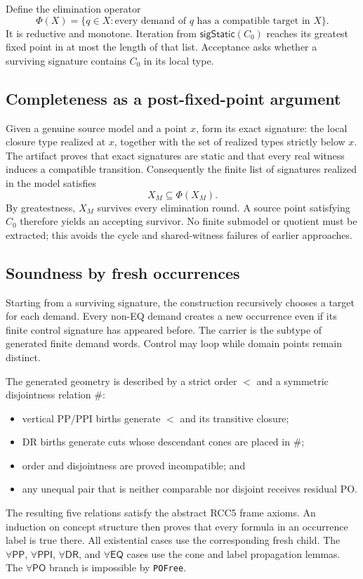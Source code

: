 \documentclass[11pt]{article}
\newcommand{\PP}{\mathsf{PP}}
\newcommand{\PPI}{\mathsf{PPI}}
\newcommand{\PO}{\mathsf{PO}}
\newcommand{\DR}{\mathsf{DR}}
\newcommand{\EQ}{\mathsf{EQ}}
\newcommand{\code}[1]{\texttt{#1}}
\begin{document}
Define the elimination operator
\[
  \Phi(X)=\{q\in X:\text{every demand of }q\text{ has a compatible target in }X\}.
\]
It is reductive and monotone. Iteration from $\mathsf{sigStatic}(C_0)$ reaches its
greatest fixed point in at most the length of that list. Acceptance asks whether a
surviving signature contains $C_0$ in its local type.

\subsection{Completeness as a post-fixed-point argument}

Given a genuine source model and a point $x$, form its exact signature:
the local closure type realized at $x$, together with the set of realized types strictly
below $x$. The artifact proves that exact signatures are static and that every real
witness induces a compatible transition. Consequently the finite list of signatures
realized in the model satisfies
\[
  X_{M}\subseteq \Phi(X_{M}).
\]
By greatestness, $X_M$ survives every elimination round. A source point satisfying
$C_0$ therefore yields an accepting survivor. No finite submodel or quotient must be
extracted; this avoids the cycle and shared-witness failures of earlier approaches.

\subsection{Soundness by fresh occurrences}

Starting from a surviving signature, the construction recursively chooses a target for
each demand. Every non-EQ demand creates a new occurrence even if its finite control
signature has appeared before. The carrier is the subtype of generated finite demand
words. Control may loop while domain points remain distinct.

The generated geometry is described by a strict order $<$ and a symmetric disjointness
relation $\#$:
\begin{itemize}
  \item vertical PP/PPI births generate $<$ and its transitive closure;
  \item DR births generate cuts whose descendant cones are placed in $\#$;
  \item order and disjointness are proved incompatible; and
  \item any unequal pair that is neither comparable nor disjoint receives residual PO.
\end{itemize}
The resulting five relations satisfy the abstract RCC5 frame axioms. An induction on
concept structure then proves that every formula in an occurrence label is true there.
All existential cases use the corresponding fresh child. The $\forall\PP$,
$\forall\PPI$, $\forall\DR$, and $\forall\EQ$ cases use the cone and label propagation
lemmas. The $\forall\PO$ branch is impossible by \code{POFree}.
\end{document}

